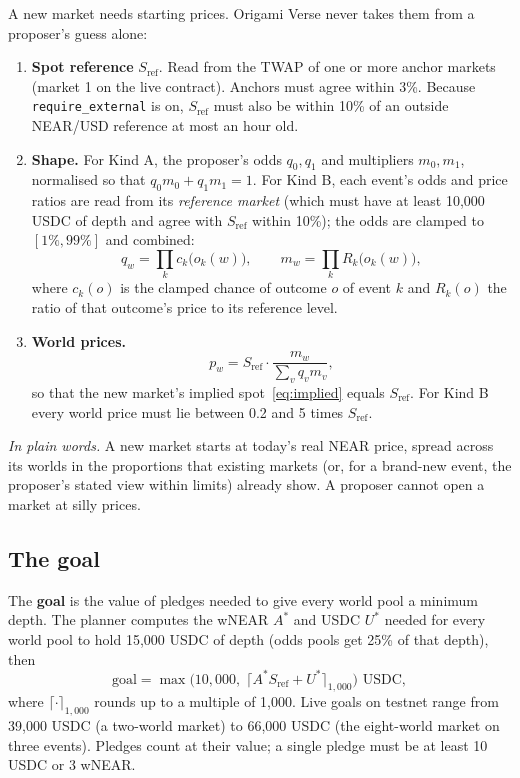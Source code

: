 \documentclass[11pt,a4paper]{article}
\newcommand{\code}[1]{\texttt{\small #1}}
\newcommand{\inwords}[1]{\par\noindent\colorbox{note}{\parbox{\dimexpr\linewidth-2\fboxsep}{\small\textit{In plain words.} #1}}\par}
\begin{document}
A new market needs starting prices. Origami Verse never takes them from a proposer's guess alone:
\begin{enumerate}
\item \textbf{Spot reference} $S_{\text{ref}}$. Read from the TWAP of one or more anchor markets (market 1 on the live
contract). Anchors must agree within 3\%. Because \code{require\_external} is on, $S_{\text{ref}}$ must also be within
10\% of an outside NEAR/USD reference at most an hour old.
\item \textbf{Shape.} For Kind A, the proposer's odds $q_0, q_1$ and multipliers $m_0, m_1$, normalised so that
$q_0 m_0 + q_1 m_1 = 1$. For Kind B, each event's odds and price ratios are read from its \emph{reference market}
(which must have at least 10,000 USDC of depth and agree with $S_{\text{ref}}$ within 10\%); the odds are clamped to
$[1\%, 99\%]$ and combined:
\begin{equation}
  q_w = \prod_{k} c_k\big(o_k(w)\big), \qquad m_w = \prod_k R_k\big(o_k(w)\big),
  \label{eq:kindb}
\end{equation}
where $c_k(o)$ is the clamped chance of outcome $o$ of event $k$ and $R_k(o)$ the ratio of that outcome's price to
its reference level.
\item \textbf{World prices.}
\begin{equation}
  p_w = S_{\text{ref}} \cdot \frac{m_w}{\sum_v q_v m_v},
  \label{eq:shape}
\end{equation}
so that the new market's implied spot~\eqref{eq:implied} equals $S_{\text{ref}}$. For Kind B every world price
must lie between 0.2 and 5 times $S_{\text{ref}}$.
\end{enumerate}
\inwords{A new market starts at today's real NEAR price, spread across its worlds in the proportions that existing
markets (or, for a brand-new event, the proposer's stated view within limits) already show. A proposer cannot open a
market at silly prices.}

\subsection{The goal}

The \textbf{goal} is the value of pledges needed to give every world pool a minimum depth. The planner computes the
wNEAR $A^\ast$ and USDC $U^\ast$ needed for every world pool to hold 15,000 USDC of depth (odds pools get 25\% of that
depth), then
\begin{equation}
  \text{goal} = \max\!\Big(10{,}000,\; \big\lceil A^\ast S_{\text{ref}} + U^\ast \big\rceil_{1{,}000}\Big) \text{ USDC},
  \label{eq:goal}
\end{equation}
where $\lceil\cdot\rceil_{1{,}000}$ rounds up to a multiple of 1,000. Live goals on testnet range from 39,000 USDC
(a two-world market) to 66,000 USDC (the eight-world market on three events). Pledges count at their value; a single
pledge must be at least 10 USDC or 3 wNEAR.
\end{document}

